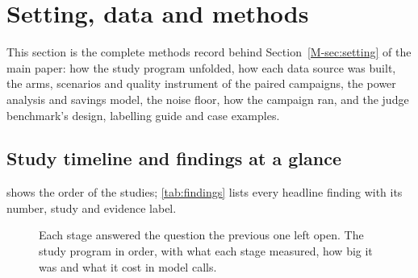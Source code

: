 \section{Setting, data and methods}\label{sec:methods}

This section is the complete methods record behind Section~\ref{M-sec:setting} of the main paper: how the study
program unfolded, how each data source was built, the arms, scenarios and quality instrument of the paired campaigns,
the power analysis and savings model, the noise floor, how the campaign ran, and the judge benchmark's design,
labelling guide and case examples.

\subsection{Study timeline and findings at a glance}\label{sec:timeline}
 shows the order of the studies; \cref{tab:findings} lists every headline finding with its number,
study and evidence label.
\begin{figure}[tbp]
\centering

\caption{Each stage answered the question the previous one left open. The study program in order, with what each stage
measured, how big it was and what it cost in model calls.}
\label{fig:timeline}
\end{figure}
\begin{table}[tbp]
\centering\small
\caption{Findings at a glance. ``Preregistered'' means the hypothesis and its threshold were fixed before the data;
``replicated'' means an independent set of scenarios gave the same answer; ``exploratory'' findings are hypotheses.}
\label{tab:findings}

\end{table}










